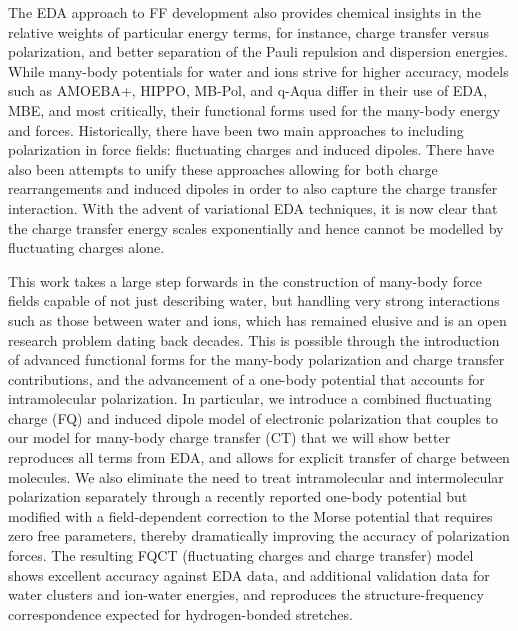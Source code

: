\documentclass[journal=jctcce,manuscript=article]{achemso}
\begin{document}
The EDA approach to FF development also provides chemical insights in the relative weights of particular energy terms, for instance, charge transfer versus polarization, and better separation of the Pauli repulsion and dispersion energies. While many-body potentials for water and ions strive for higher accuracy, models such as AMOEBA+, HIPPO\cite{rackers2021polarizable}, MB-Pol, and q-Aqua differ in their use of EDA, MBE, and most critically, their functional forms used for the many-body energy and forces. Historically, there have been two main approaches to including polarization in force fields: fluctuating charges\cite{rick1994dynamical} and induced dipoles\cite{applequist1985multipole}. There have also been attempts to unify these approaches allowing for both charge rearrangements and induced dipoles\cite{stern2001combined} in order to also capture the charge transfer interaction.\cite{rick1994dynamical} With the advent
of variational EDA  techniques\cite{khaliullin2007,horn2016probing,Mao:2021:EDA-review}, it is now clear that the charge transfer energy scales exponentially and hence cannot be modelled by fluctuating charges alone. 

This work takes a large step forwards in the construction of many-body force fields capable of not just describing water, but handling very strong interactions such as those between water and ions, which has remained elusive and is an open research problem dating back decades. This is possible through the introduction of advanced functional forms for the many-body polarization and charge transfer contributions, and the advancement of a one-body potential that accounts for intramolecular polarization. In particular, we introduce a combined fluctuating charge (FQ) and induced dipole model of electronic polarization that couples to our model for many-body charge transfer (CT) that we will show better reproduces all terms from EDA, and allows for explicit transfer of charge between molecules. We also eliminate the need to treat intramolecular and intermolecular polarization separately through a recently reported one-body potential\cite{Sami2024} but modified with a field-dependent correction to the Morse potential that requires zero free parameters, thereby dramatically improving the accuracy of polarization forces. The resulting FQCT (fluctuating charges and charge transfer) model shows excellent accuracy against EDA data, and additional validation data for water clusters and ion-water energies, and reproduces the structure-frequency correspondence expected for hydrogen-bonded  stretches.
\end{document}
